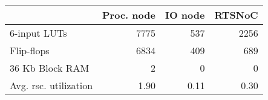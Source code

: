 
\begin{tabular}{lrrr}
\toprule
                          & Proc. node & IO node & RTSNoC \\
\midrule
6-input LUTs              & 7775       & ~537    & 2256    \\
Flip-flops                & 6834       & ~409    & ~689    \\
36 Kb Block RAM           & ~~~2       & ~~~0    & ~~~0    \\
\midrule
Avg. rsc. utilization     & 1.90       & 0.11    & 0.30    \\
\bottomrule
\end{tabular}


